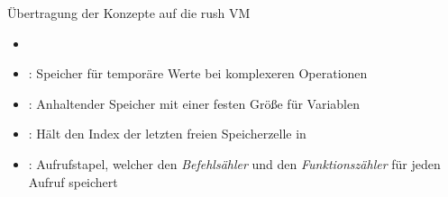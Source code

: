 \begin{frame}{Übertragung der Konzepte auf die rush VM }
	\begin{itemize}
		\item {}
		\item {}: Speicher für temporäre Werte bei komplexeren Operationen
		\item {}: Anhaltender Speicher mit einer festen Größe für Variablen
		\item {}: Hält den Index der letzten freien Speicherzelle in 
		\item {}: Aufrufstapel, welcher den \emph{Befehlsähler} und den \emph{Funktionszähler} für jeden Aufruf speichert
	\end{itemize}
\end{frame}


